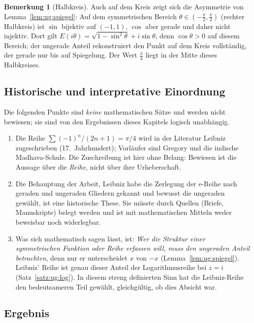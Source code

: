 \documentclass[a4paper,12pt,twoside]{report}
\theoremstyle{definition}
\newtheorem{bemerkung}{Bemerkung}
\begin{document}
\begin{bemerkung}[Halbkreis]
Auch auf dem Kreis zeigt sich die Asymmetrie von Lemma~\ref{lem:ug:spiegel}: Auf dem symmetrischen Bereich $\theta\in(-\frac\pi2,\frac\pi2)$ (rechter Halbkreis) ist $\sin$ bijektiv auf $(-1,1)$, $\cos$ aber gerade und daher nicht injektiv. Dort gilt $E(i\theta)=\sqrt{1-\sin^2\theta}+i\sin\theta$, denn $\cos\theta>0$ auf diesem Bereich; der ungerade Anteil rekonstruiert den Punkt auf dem Kreis vollständig, der gerade nur bis auf Spiegelung. Der Wert $\frac\pi4$ liegt in der Mitte dieses Halbkreises.
\end{bemerkung}

\subsection{Historische und interpretative Einordnung}
\label{sec:ug:historie}

Die folgenden Punkte sind \emph{keine} mathematischen Sätze und werden nicht bewiesen; sie sind von den Ergebnissen dieses Kapitels logisch unabhängig.

\begin{enumerate}
\item Die Reihe $\sum(-1)^n/(2n+1)=\pi/4$ wird in der Literatur Leibniz zugeschrieben (17.~Jahrhundert); Vorläufer sind Gregory und die indische Madhava-Schule. Die Zuschreibung ist hier ohne Belang: Bewiesen ist die Aussage über die \emph{Reihe}, nicht über ihre Urheberschaft.
\item Die Behauptung der Arbeit, Leibniz habe die Zerlegung der e-Reihe nach geraden und ungeraden Gliedern gekannt und bewusst die ungeraden gewählt, ist eine historische These. Sie müsste durch Quellen (Briefe, Manuskripte) belegt werden und ist mit mathematischen Mitteln weder beweisbar noch widerlegbar.
\item Was sich mathematisch sagen lässt, ist: \emph{Wer die Struktur einer symmetrischen Funktion oder Reihe erfassen will, muss den ungeraden Anteil betrachten}, denn nur er unterscheidet $x$ von $-x$ (Lemma~\ref{lem:ug:spiegel}). Leibniz' Reihe ist genau dieser Anteil der Logarithmusreihe bei $z=i$ (Satz~\ref{satz:ug:log}). In diesem streng definierten Sinn hat die Leibniz-Reihe den bedeutsameren Teil gewählt, gleichgültig, ob dies Absicht war.
\end{enumerate}

\subsection{Ergebnis}
\label{sec:ug:ergebnis}
\end{document}
